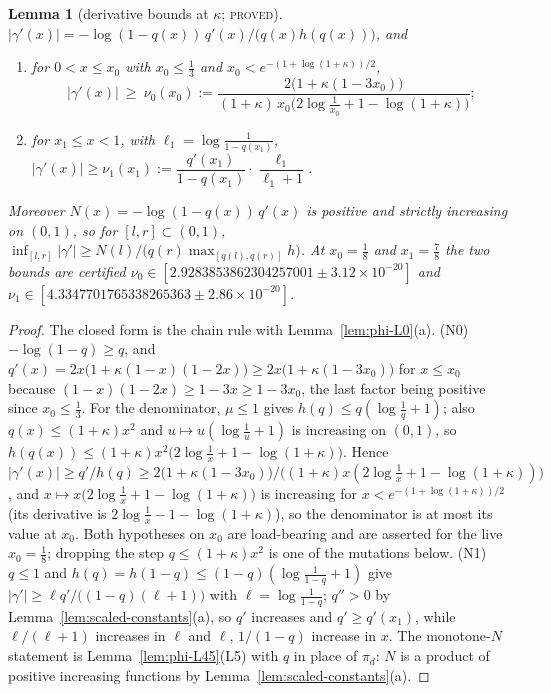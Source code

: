 \documentclass[11pt]{article}
\theoremstyle{plain}
\newtheorem{lemma}[theorem]{Lemma}
\theoremstyle{definition}
\theoremstyle{remark}
\newcommand{\lbl}[1]{\textsc{#1}}
\begin{document}
\begin{lemma}[derivative bounds at $\kappa$; \lbl{proved}]\label{lem:scaled-N}
$|\gamma'(x)|=-\log(1-q(x))\,q'(x)/\bigl(q(x)h(q(x))\bigr)$, and
\begin{enumerate}[label=(N\arabic*),start=0,nosep]
\item for $0<x\le x_0$ with $x_0\le\tfrac13$ and $x_0<e^{-(1+\log(1+\kappa))/2}$,
\[
  |\gamma'(x)|\ \ge\ \nu_0(x_0):=\frac{2\bigl(1+\kappa(1-3x_0)\bigr)}
  {(1+\kappa)\,x_0\bigl(2\log\frac1{x_0}+1-\log(1+\kappa)\bigr)};
\]
\item for $x_1\le x<1$, with $\ell_1=\log\frac1{1-q(x_1)}$,
$|\gamma'(x)|\ge\nu_1(x_1):=\dfrac{q'(x_1)}{1-q(x_1)}\cdot\dfrac{\ell_1}{\ell_1+1}$.
\end{enumerate}
Moreover $N(x)=-\log(1-q(x))\,q'(x)$ is positive and strictly increasing on
$(0,1)$, so for $[l,r]\subset(0,1)$,
$\inf_{[l,r]}|\gamma'|\ge N(l)\big/\bigl(q(r)\max_{[q(l),q(r)]}h\bigr)$.
At $x_0=\tfrac18$ and $x_1=\tfrac78$ the two bounds are certified
$\nu_0\in[2.9283853862304257001\pm3.12\times10^{-20}]$ and
$\nu_1\in[4.3347701765338265363\pm2.86\times10^{-20}]$.
\end{lemma}
\begin{proof}
The closed form is the chain rule with Lemma~\ref{lem:phi-L0}(a).
(N0) $-\log(1-q)\ge q$, and $q'(x)=2x\bigl(1+\kappa(1-x)(1-2x)\bigr)\ge2x\bigl(1+\kappa(1-3x_0)\bigr)$
for $x\le x_0$ because $(1-x)(1-2x)\ge1-3x\ge1-3x_0$, the last factor being
positive since $x_0\le\tfrac13$.  For the denominator, $\mu\le1$ gives
$h(q)\le q(\log\frac1q+1)$; also $q(x)\le(1+\kappa)x^2$ and
$u\mapsto u(\log\frac1u+1)$ is increasing on $(0,1)$, so
$h(q(x))\le(1+\kappa)x^2\bigl(2\log\frac1x+1-\log(1+\kappa)\bigr)$.  Hence
$|\gamma'(x)|\ge q'/h(q)\ge2\bigl(1+\kappa(1-3x_0)\bigr)/\bigl((1+\kappa)x(2\log\frac1x+1-\log(1+\kappa))\bigr)$,
and $x\mapsto x\bigl(2\log\frac1x+1-\log(1+\kappa)\bigr)$ is increasing for
$x<e^{-(1+\log(1+\kappa))/2}$ (its derivative is
$2\log\frac1x-1-\log(1+\kappa)$), so the denominator is at most its value at
$x_0$.  Both hypotheses on $x_0$ are load-bearing and are asserted for the
live $x_0=\tfrac18$; dropping the step $q\le(1+\kappa)x^2$ is one of the
mutations below.  (N1) $q\le1$ and $h(q)=h(1-q)\le(1-q)(\log\frac1{1-q}+1)$
give $|\gamma'|\ge\ell q'/\bigl((1-q)(\ell+1)\bigr)$ with
$\ell=\log\frac1{1-q}$; $q''>0$ by Lemma~\ref{lem:scaled-constants}(a), so
$q'$ increases and $q'\ge q'(x_1)$, while $\ell/(\ell+1)$ increases in $\ell$
and $\ell$, $1/(1-q)$ increase in $x$.  The monotone-$N$ statement is
Lemma~\ref{lem:phi-L45}(L5) with $q$ in place of $\pi_d$: $N$ is a product of
positive increasing functions by Lemma~\ref{lem:scaled-constants}(a).
\end{proof}
\end{document}
